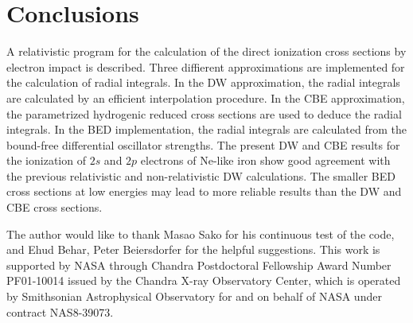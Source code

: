 \documentclass[preprint, floatfix, pra, showpacs, showkeys]{revtex4}
\begin{document}
\section{Conclusions}
\label{sec_conclusions}
A relativistic program for the calculation of the direct ionization cross
sections by electron impact is described. Three diffierent
approximations are implemented for the calculation of radial integrals.
In the DW approximation,  the radial integrals are calculated by an efficient
interpolation procedure. In the CBE approximation, the parametrized hydrogenic
reduced cross sections are used to deduce the radial integrals. In the BED
implementation, the radial integrals are calculated from the bound-free
differential oscillator strengths. 
The present DW and CBE results for the ionization of
$2s$ and $2p$ electrons of Ne-like iron show good agreement with the previous
relativistic and non-relativistic DW calculations. The smaller BED cross
sections at low energies may lead to more reliable results than
the DW and CBE cross sections.

\begin{acknowledgments}
The author would like to thank Masao Sako for his continuous test of the code,
and Ehud Behar, Peter Beiersdorfer for the helpful suggestions. 
This work is supported by
NASA through Chandra Postdoctoral Fellowship Award Number PF01-10014 issued by
the Chandra X-ray Observatory Center, which is operated by Smithsonian
Astrophysical Observatory for and on behalf of NASA under contract NAS8-39073.
\end{acknowledgments}



\end{document}
